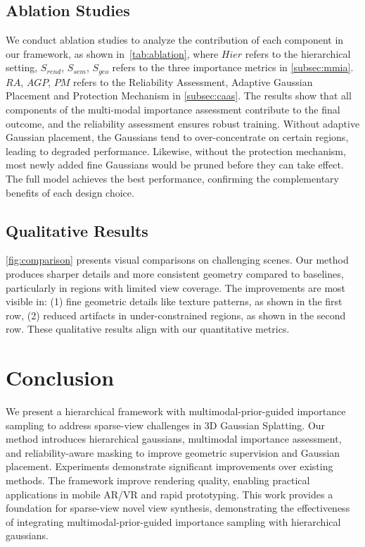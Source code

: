 \documentclass{article}
\begin{document}
  \subsection{Ablation Studies}
  
  We conduct ablation studies to analyze the contribution of each component in our framework, as shown in~\cref{tab:ablation}, where $Hier$ refers to the  hierarchical setting, $S_{rend}$, $S_{sem}$, $S_{geo}$ refers to the three importance metrics in \cref{subsec:mmia}. $RA$, $AGP$, $PM$ refers to the Reliability Assessment, Adaptive Gaussian Placement and Protection Mechanism in \cref{subsec:caas}.
  The results show that all components of the multi-modal importance assessment contribute to the final outcome, and the reliability assessment ensures robust training. Without adaptive Gaussian placement, the Gaussians tend to over-concentrate on certain regions, leading to degraded performance. Likewise, without the protection mechanism, most newly added fine Gaussians would be pruned before they can take effect. The full model achieves the best performance, confirming the complementary benefits of each design choice.
  \subsection{Qualitative Results}
  
  \cref{fig:comparison} presents visual comparisons on challenging scenes. Our method produces sharper details and more consistent geometry compared to baselines, particularly in regions with limited view coverage.
  The improvements are most visible in: (1) fine geometric details like texture patterns, as shown in the first row, (2) reduced artifacts in under-constrained regions, as shown in the second row. These qualitative results align with our quantitative metrics.
  
  \section{Conclusion}
  \label{sec:conc}
  We present a hierarchical framework with multimodal-prior-guided  importance sampling to address sparse-view challenges in 3D Gaussian Splatting. Our method introduces hierarchical gaussians, multimodal importance assessment, and reliability-aware masking to improve geometric supervision and Gaussian placement.
  Experiments demonstrate significant improvements over existing methods.
  The framework improve rendering quality, enabling practical applications in mobile AR/VR and rapid prototyping.
  This work provides a foundation for sparse-view novel view synthesis, demonstrating the effectiveness of integrating multimodal-prior-guided importance sampling with hierarchical gaussians.

  


\end{document}
